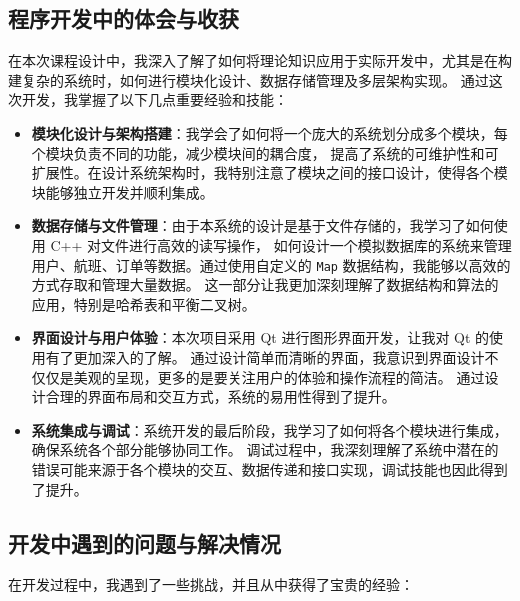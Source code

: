 \documentclass[UTF8, a4paper,12pt]{ctexart}
\begin{document}
\subsection{程序开发中的体会与收获}

在本次课程设计中，我深入了解了如何将理论知识应用于实际开发中，尤其是在构建复杂的系统时，如何进行模块化设计、数据存储管理及多层架构实现。
通过这次开发，我掌握了以下几点重要经验和技能：

\begin{itemize}
    \item \textbf{模块化设计与架构搭建}：我学会了如何将一个庞大的系统划分成多个模块，每个模块负责不同的功能，减少模块间的耦合度，
    提高了系统的可维护性和可扩展性。在设计系统架构时，我特别注意了模块之间的接口设计，使得各个模块能够独立开发并顺利集成。
    
    \item \textbf{数据存储与文件管理}：由于本系统的设计是基于文件存储的，我学习了如何使用 C++ 对文件进行高效的读写操作，
    如何设计一个模拟数据库的系统来管理用户、航班、订单等数据。通过使用自定义的 \texttt{Map} 数据结构，我能够以高效的方式存取和管理大量数据。
    这一部分让我更加深刻理解了数据结构和算法的应用，特别是哈希表和平衡二叉树。

    \item \textbf{界面设计与用户体验}：本次项目采用 Qt 进行图形界面开发，让我对 Qt 的使用有了更加深入的了解。
    通过设计简单而清晰的界面，我意识到界面设计不仅仅是美观的呈现，更多的是要关注用户的体验和操作流程的简洁。
    通过设计合理的界面布局和交互方式，系统的易用性得到了提升。

    \item \textbf{系统集成与调试}：系统开发的最后阶段，我学习了如何将各个模块进行集成，确保系统各个部分能够协同工作。
    调试过程中，我深刻理解了系统中潜在的错误可能来源于各个模块的交互、数据传递和接口实现，调试技能也因此得到了提升。
\end{itemize}

\subsection{开发中遇到的问题与解决情况}

在开发过程中，我遇到了一些挑战，并且从中获得了宝贵的经验：
\end{document}
